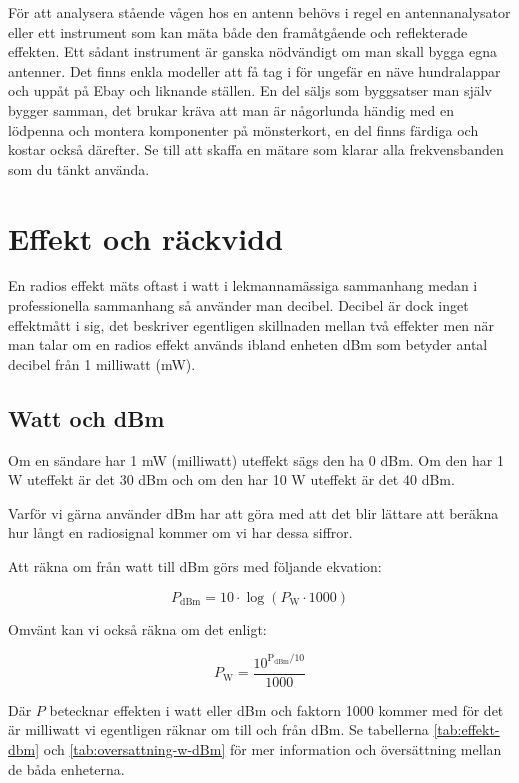 För att analysera stående vågen hos en antenn behövs i regel en antennanalysator eller ett instrument som kan mäta både den framåtgående och reflekterade effekten. Ett sådant instrument är ganska nödvändigt om man skall bygga egna antenner. Det finns enkla modeller att få tag i för ungefär en näve hundralappar och uppåt på Ebay och liknande ställen. En del säljs som byggsatser man själv bygger samman, det brukar kräva att man är någorlunda händig med en lödpenna och montera komponenter på mönsterkort, en del finns färdiga och kostar också därefter. Se till att skaffa en mätare som klarar alla frekvensbanden som du tänkt använda.

\section{Effekt och räckvidd}

En radios effekt mäts oftast i watt i lekmannamässiga sammanhang medan i professionella sammanhang så använder man decibel. Decibel är dock inget effektmått i sig, det beskriver egentligen skillnaden mellan två effekter men när man talar om en radios effekt används ibland enheten dBm som betyder antal decibel från 1 milliwatt (mW).

\subsection{Watt och dBm}

Om en sändare har 1 mW (milliwatt) uteffekt sägs den ha 0 dBm. Om den har 1 W uteffekt är det 30 dBm och om den har 10 W uteffekt är det 40 dBm.

Varför vi gärna använder dBm har att göra med att det blir lättare att beräkna hur långt en radiosignal kommer om vi har dessa siffror. 

Att räkna om från watt till dBm görs med följande ekvation:

\begin{equation}
P_{\mathrm{dBm}}=10\cdot\log(P_{\mathrm{W}}\cdot 1000)
\end{equation}

Omvänt kan vi också räkna om det enligt:

\begin{equation}
P_{\mathrm{W}}=\frac{10^{\mathrm{P_{dBm}}/10}}{1000}
\end{equation}

Där $P$ betecknar effekten i watt eller dBm och faktorn 1000 kommer med för det är milliwatt vi egentligen räknar om till och från dBm. Se tabellerna \ref{tab:effekt-dbm} och \ref{tab:oversattning-w-dBm} för mer information och översättning mellan de båda enheterna.


